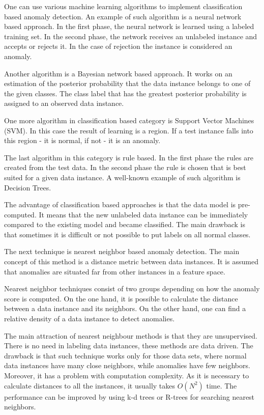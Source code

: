 One can use various machine learning algorithms to implement classification based anomaly detection.
An example of such algorithm is a neural network based approach.
In the first phase, the neural network is learned using a labeled training set. 
In the second phase, the network receives an unlabeled instance and accepts or rejects it.
In the case of rejection the instance is considered an anomaly.

Another algorithm is a Bayesian network based approach.
It works on an estimation of the posterior probability that the data instance belongs to one of the given classes.
The class label that has the greatest posterior probability is assigned to an observed data instance.

One more algorithm in classification based category is Support Vector Machines (SVM).
In this case the result of learning is a region.
If a test instance falls into this region - it is normal, if not - it is an anomaly.

The last algorithm in this category is rule based.
In the first phase the rules are created from the test data.
In the second phase the rule is chosen that is best suited for a given data instance. 
A well-known example of such algorithm is Decision Trees.

The advantage of classification based approaches is that the data model is pre-computed.
It means that the new unlabeled data instance can be immediately compared to the existing model and became classified.
The main drawback is that sometimes it is difficult or not possible to put labels on all normal classes.

The next technique is nearest neighbor based anomaly detection.
The main concept of this method is a distance metric between data instances.
It is assumed that anomalies are situated far from other instances in a feature space.

Nearest neighbor techniques consist of two groups depending on how the anomaly score is computed.
On the one hand, it is possible to calculate the distance between a data instance and its neighbors.
On the other hand, one can find a relative density of a data instance to detect anomalies.

The main attraction of nearest neighbour methods is that they are unsupervised.
There is no need in labeling data instances, these methods are data driven.
The drawback is that such technique works only for those data sets, where normal data instances have many close neighbors, while anomalies have few neighbors.
Moreover, it has a problem with computation complexity.
As it is necessary to calculate distances to all the instances, it usually takes $O(N^2)$ time.
The performance can be improved by using k-d trees or R-trees for searching nearest neighbors.

